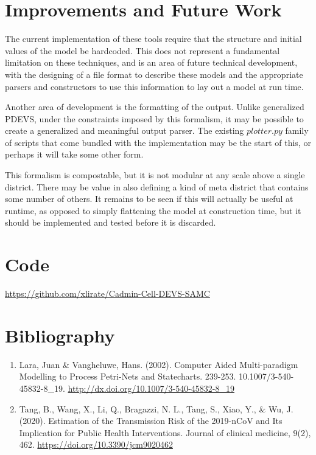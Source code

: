 \documentclass[twocolumn]{article}
\begin{document}
\FloatBarrier
\section{Improvements and Future Work}

The current implementation of these tools require that the structure and initial values of the model be hardcoded. This does not represent a fundamental limitation on these techniques, and is an area of future technical development, with the designing of a file format to describe these models and the appropriate parsers and constructors to use this information to lay out a model at run time. 

Another area of development is the formatting of the output. Unlike generalized PDEVS, under the constraints imposed by this formalism, it may be possible to create a generalized and meaningful output parser. The existing $plotter.py$ family of scripts that come bundled with the implementation may be the start of this, or perhaps it will take some other form.

This formalism is compostable, but it is not modular at any scale above a single district. There may be value in also defining a kind of meta district that contains some number of others. It remains to be seen if this will actually be useful at runtime, as opposed to simply flattening the model at construction time, but it should be implemented and tested before it is discarded.

\section{Code}

\url{https://github.com/xlirate/Cadmin-Cell-DEVS-SAMC}

\section{Bibliography}

\begin{enumerate}

\item Lara, Juan \& Vangheluwe, Hans. (2002). Computer Aided Multi-paradigm Modelling to Process Petri-Nets and Statecharts. 239-253. 10.1007/3-540-45832-8\_19. \url{http://dx.doi.org/10.1007/3-540-45832-8_19}

\item Tang, B., Wang, X., Li, Q., Bragazzi, N. L., Tang, S., Xiao, Y., \& Wu, J. (2020).
Estimation of the Transmission Risk of the 2019-nCoV and Its Implication for
Public Health Interventions. Journal of clinical medicine, 9(2), 462.
\url{https://doi.org/10.3390/jcm9020462}

\end{enumerate}
\end{document}
